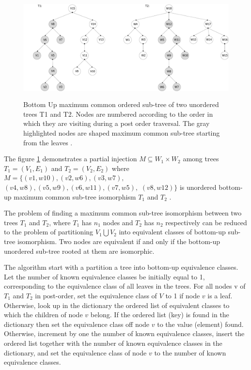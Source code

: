 \documentclass{report}
\begin{document}
\begin{figure}[th]
  \centering
  \includegraphics[scale=0.45]{Figures/algorithms/BU/bottom-up-max-common-example.pdf}\\[0.1cm]
  \caption[Bottom Up maximum common ordered sub-tree of two unordered trees T1 and T2]{Bottom Up maximum common ordered sub-tree of two unordered trees T1 and T2. Nodes are numbered according to the order in which they are visiting during a post order traversal. The gray highlighted nodes are shaped maximum common sub-tree starting from the leaves \cite{valiente}.}
  \label{fig:bottom-up-max-common-example}
\end{figure}

The figure \ref{fig:bottom-up-max-common-example} demonstrates a partial injection $M \subseteq W_{1} \times  W_{2}$ among trees $ T_{1} = ( V_{1}, E_{1})$ and  $ T_{2} = ( V_{2}, E_{2})$ where $M  = \{ (v1,w10),  (v2,w6), (v3,w7), $ \\
$(v4,w8),  (v5,w9),  (v6,w11),  (v7,w5), $  $ (v8,w12)\}$ is unordered bottom-up maximum common sub-tree isomorphism $ T_{1}$ and $ T_{2 }$ \cite{valiente}.

The problem of finding a maximum common sub-tree isomorphism between two trees $ T_{1}$ and $ T_{2 }$, where $ T_{1}$ has $n_{1}$ nodes and $ T_{2}$ has $n_{2}$ respectively can be reduced to the problem of partitioning $ V_{1}\bigcup V_{2}$ into equivalent classes of bottom-up sub-tree isomorphism. Two nodes are equivalent if and only if the bottom-up unordered sub-tree rooted at them are isomorphic.

The algorithm start with a partition a tree into bottom-up equivalence classes.
Let the number of known equivalence classes be initially equal to 1, corresponding to the equivalence class of all leaves in the trees. For all nodes v of $ T_{1}$ and $ T_{2 }$ in post-order, set the equivalence class of $V$ to 1 if node $v$ is a leaf. Otherwise, look up in the dictionary the ordered list of equivalent classes to which the children of node $v$ belong. If the ordered list (key) is found in the dictionary then set the equivalence class off node $v$ to the value (element) found. Otherwise, increment by one the number of known equivalence classes, insert the ordered list together with the number of known equivalence classes in the dictionary, and set the equivalence class of node $v$ to the number of known equivalence classes.
\end{document}
